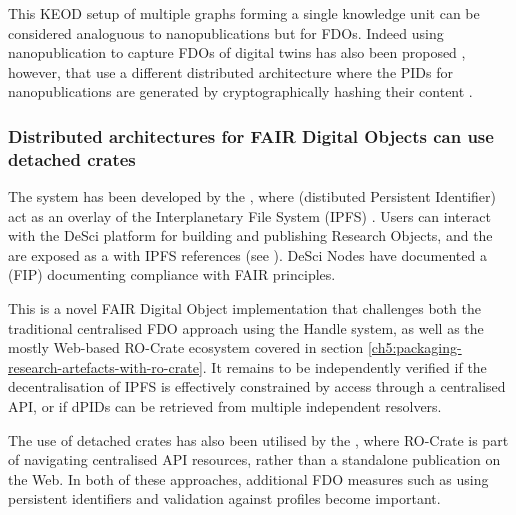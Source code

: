 This KEOD setup of multiple graphs forming a single knowledge unit can be considered analoguous to nanopublications \cite{Kuhn 2021} but for FDOs. Indeed using nanopublication to capture FDOs of digital twins has also been proposed \cite{Schultes 2022}, however, that use a different distributed architecture where the PIDs for nanopublications are generated by cryptographically hashing their content \cite{Kuhn 2021}.


\subsubsection{Distributed architectures for FAIR Digital Objects can use detached crates}
\label{ch61:dpid}

The  system has been developed by the , where  (distibuted Persistent Identifier) act  as an overlay of the Interplanetary File System (IPFS) \cite{Trautwein 2022}. 
Users can interact with the DeSci platform for building and publishing Research Objects, and the  are exposed as a  with IPFS references (see ). 
DeSci Nodes have documented a  (FIP) \cite{Schultes 2020} documenting compliance with FAIR principles. 

This is a novel FAIR Digital Object implementation that challenges both the traditional centralised FDO approach using the Handle system, as well as the mostly Web-based RO-Crate ecosystem covered in section \vref{ch5:packaging-research-artefacts-with-ro-crate}. It remains to be independently verified if the decentralisation of IPFS is effectively constrained by access through a centralised API, or if dPIDs can be retrieved from multiple independent resolvers.

The use of detached crates has also been utilised by the , where RO-Crate is part of navigating centralised API resources, rather than a standalone publication on the Web. In both of these approaches, additional FDO measures such as using persistent identifiers and validation against profiles become important. 


